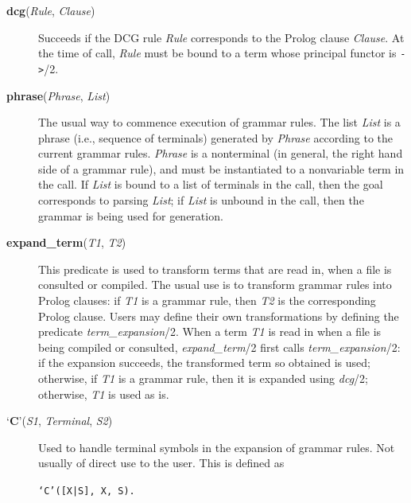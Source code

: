 \begin{description}
\item[{\bf dcg}({\em Rule}, {\em Clause})]
    Succeeds if the DCG rule {\em Rule} corresponds to the Prolog clause
    {\em Clause}.
    At the time of call, {\em Rule} must be bound to a term
    whose principal functor is {\tt ->}/2.

\item[{\bf phrase}({\em Phrase}, {\em List})]
    The usual way to commence execution of grammar rules.
    The list {\em List} is a phrase (i.e., sequence of terminals) generated by
    {\em Phrase} according to the current grammar rules.
    {\em Phrase} is a nonterminal
    (in general, the right hand side of a grammar rule),
    and must be instantiated to a nonvariable term in the call.
    If {\em List} is bound to a list of terminals in the call,
    then the goal corresponds to parsing {\em List};
    if {\em List} is unbound in the call,
    then the grammar is being used for generation.

\item[{\bf expand\_term}({\em T1}, {\em T2})]
    This predicate is used to transform terms that are read in,
    when a file is consulted or compiled.
    The usual use is to transform grammar rules into Prolog clauses:
    if {\em T1} is a grammar rule,
    then {\em T2} is the corresponding Prolog clause.
    Users may define their own transformations by defining the predicate
    {\em term\_expansion}/2.
    When a term {\em T1} is read in when a file is being compiled or consulted,
    {\em expand\_term}/2 first calls {\em term\_expansion}/2:
    if the expansion succeeds, the transformed term so obtained is used;
    otherwise, if {\em T1} is a grammar rule,
    then it is expanded using {\em dcg}/2; otherwise, {\em T1} is used as is.

\item[`{\bf C}'({\em S1}, {\em Terminal}, {\em S2})]
    Used to handle terminal symbols in the expansion of grammar rules.
    Not usually of direct use to the user.
    This is defined as
    \begin{center}
    {\tt `C'([X|S], X, S).}
    \end{center}
\end{description}

